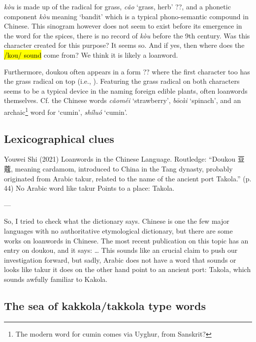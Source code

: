 \documentclass[12pt]{article}
\newcommand{\tc}[1]{\traditionalchinesefont{#1}\rmfamily}
\begin{document}
\tc{蔻} \textit{kòu} is made up of the radical for grass, \tc{艹} \textit{cǎo} `grass, herb' ??, and a phonetic component \tc{寇} \textit{kòu} meaning `bandit' which is a typical phono-semantic compound in Chinese. This sinogram however does not seem to exist before its emergence in the word for the spices, there is no record of \tc{蔻} \textit{kòu} before the 9th century. Was this character created for this purpose? It seems so. And if yes, then where does the \hl{/kou/ sound} come from? We think it is likely a loanword.

Furthermore, doukou often appears in a form ?? where the first character too has the grass radical on top (i.e., \tc{荳蔻}). Featuring the grass radical on both characters seems to be a typical device in the naming foreign edible plants, often loanwords themselves. Cf. the Chinese words \tc{草莓} \textit{cǎoméi} `strawberry', \tc{菠菜} \textit{bōcài} `spinach', and an archaic\footnote{The modern word for cumin comes via Uyghur, from Sanskrit?} word for `cumin', \tc{蒔蘿} \textit{shíluó} `cumin'.

\subsection{Lexicographical clues}

Youwei Shi (2021) Loanwords in the Chinese Language. Routledge:
	“Doukou 豆蔻, meaning cardamom, introduced to China in the 	Tang dynasty, probably originated from Arabic takur, related to 	the name of the ancient port Takola.” (p. 44)
No Arabic word like takur
Points to a place: Takola.

---

So, I tried to check what the dictionary says. Chinese is one the few major languages with no authoritative etymological dictionary, but there are some works on loanwords in Chinese. The most recent publication on this topic has an entry on doukou, and it says: 
…
This sounds like an crucial claim to push our investigation forward, 
but sadly, Arabic does not have a word that sounds or looks like takur
it does on the other hand point to an ancient port: Takola, which sounds awfully familiar to Kakola.





\subsection{The sea of kakkola/takkola type words}
\end{document}

